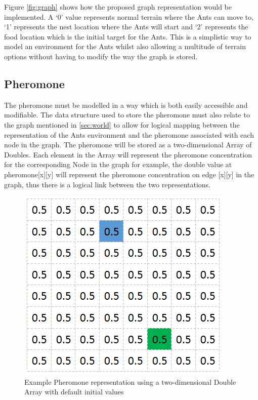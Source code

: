 \noindent
Figure \ref{fig:graph} shows how the proposed graph representation would be implemented. A `0' value represents normal terrain where the Ants can move to, `1' represents the nest location where the Ants will start and `2' represents the food location which is the initial target for the Ants. This is a simplistic way to model an environment for the Ants whilst also allowing a multitude of terrain options without having to modify the way the graph is stored.

\subsection{Pheromone}
\label{pheroRepsec}
The pheromone must be modelled in a way which is both easily accessible and modifiable. The data structure used to store the pheromone must also relate to the graph mentioned in \ref{sec:world} to allow for logical mapping between the representation of the Ants environment and the pheromone associated with each node in the graph. The pheromone will be stored as a two-dimensional Array of Doubles. Each element in the Array will represent the pheromone concentration for the corresponding Node in the graph for example, the double value at pheromone[x][y] will represent the pheromone concentration on edge [x][y] in the graph, thus there is a logical link between the two representations.

\begin{figure}[H]
\centering
\includegraphics[scale=0.8]{Images/design/phero}
\caption[Example Pheromone Representation]{Example Pheromone representation using a two-dimensional Double Array with default initial values}
\label{fig:pheroRep}
\end{figure}

